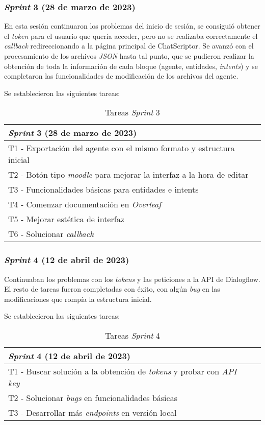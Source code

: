 \subsubsection{\textit{Sprint} 3 (28 de marzo de 2023)}
En esta sesión continuaron los problemas del inicio de sesión, se consiguió obtener el \textit{token} para el usuario que quería acceder, pero no se realizaba correctamente el \textit{callback} redireccionando a la página principal de ChatScriptor. Se avanzó con el procesamiento de los archivos \textit{JSON} hasta tal punto, que se pudieron realizar la obtención de toda la información de cada bloque (agente, entidades, \textit{intents}) y se completaron las funcionalidades de modificación de los archivos del agente.

Se establecieron las siguientes tareas:
\begin{table}[H]
\centering
\begin{tabular}{ll}
\toprule
\textit{Sprint} 3 (28 de marzo de 2023)   \\
\midrule
T1 - Exportación del agente con el mismo formato y estructura inicial\\
T2 - Botón tipo \textit{moodle} para mejorar la interfaz a la hora de editar\\
T3 - Funcionalidades básicas para entidades e intents\\
T4 - Comenzar documentación en \textit{Overleaf}\\
T5 - Mejorar estética de interfaz\\
T6 - Solucionar \textit{callback}\\
\bottomrule
\end{tabular}
\caption{Tareas \textit{Sprint} 3}
\end{table}

\subsubsection{\textit{Sprint} 4 (12 de abril de 2023)}
Continuaban los problemas con los \textit{tokens} y las peticiones a la API de Dialogflow. El resto de tareas fueron completadas con éxito, con algún \textit{bug} en las modificaciones que rompía la estructura inicial.

Se establecieron las siguientes tareas:
\begin{table}[H]
\centering
\begin{tabular}{ll}
\toprule
\textit{Sprint} 4 (12 de abril de 2023)   \\
\midrule
T1 - Buscar solución a la obtención de \textit{tokens} y probar con \textit{API key}\\
T2 - Solucionar \textit{bugs} en funcionalidades básicas\\
T3 - Desarrollar más \textit{endpoints} en versión local\\
\bottomrule
\end{tabular}
\caption{Tareas \textit{Sprint} 4}
\end{table}


